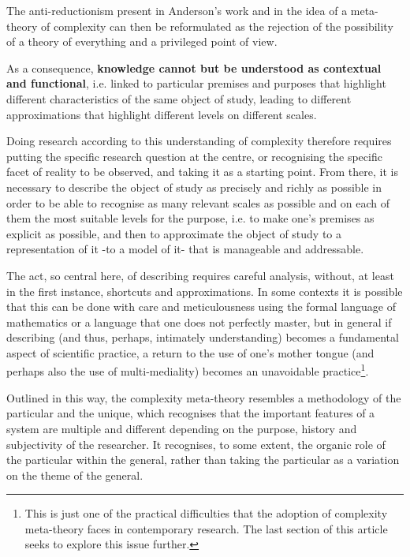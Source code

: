 \documentclass[a4paper, headings=standardclasses]{scrartcl}
\begin{document}
The anti-reductionism present in Anderson's work and in the idea of a meta-theory of complexity can then be reformulated as the rejection of the possibility of a theory of everything and a privileged point of view.

As a consequence, \textbf{knowledge cannot but be understood as contextual and functional}, i.e. linked to particular premises and purposes that highlight different characteristics of the same object of study, leading to different approximations that highlight different levels on different scales.

Doing research according to this understanding of complexity therefore requires putting the specific research question at the centre, or recognising the specific facet of reality to be observed, and taking it as a starting point.
From there, it is necessary to describe the object of study as precisely and richly as possible in order to be able to recognise as many relevant scales as possible and on each of them the most suitable levels for the purpose, i.e. to make one's premises as explicit as possible, and then to approximate the object of study to a representation of it -to a model of it- that is manageable and addressable.

The act, so central here, of describing requires careful analysis, without, at least in the first instance, shortcuts and approximations. In some contexts it is possible that this can be done with care and meticulousness using the formal language of mathematics or a language that one does not perfectly master, but in general if describing (and thus, perhaps, intimately understanding) becomes a fundamental aspect of scientific practice, a return to the use of one's mother tongue (and perhaps also the use of multi-mediality) becomes an unavoidable practice\footnote{This is just one of the practical difficulties that the adoption of complexity meta-theory faces in contemporary research. The last section of this article seeks to explore this issue further.}.

Outlined in this way, the complexity meta-theory resembles a methodology of the particular and the unique, which recognises that the important features of a system are multiple and different depending on the purpose, history and subjectivity of the researcher. It recognises, to some extent, the organic role of the particular within the general, rather than taking the particular as a variation on the theme of the general.
\end{document}
